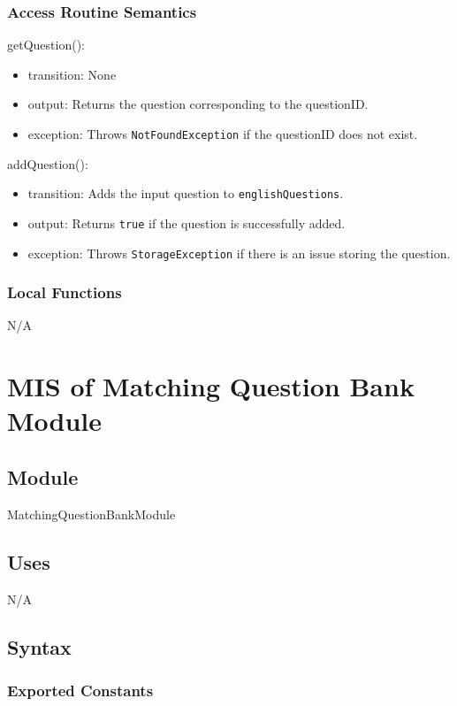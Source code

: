 \documentclass[12pt, titlepage]{article}
\begin{document}
\subsubsection{Access Routine Semantics}

\noindent getQuestion():
\begin{itemize}
\item transition: None
\item output: Returns the question corresponding to the questionID.
\item exception: Throws \texttt{NotFoundException} if the questionID does not exist.
\end{itemize}

\noindent addQuestion():
\begin{itemize}
\item transition: Adds the input question to \texttt{englishQuestions}.
\item output: Returns \texttt{true} if the question is successfully added.
\item exception: Throws \texttt{StorageException} if there is an issue storing the question.
\end{itemize}

\subsubsection{Local Functions}

N/A

\section{MIS of Matching Question Bank Module} \label{MatchingQuestionBankModule}

\subsection{Module}

MatchingQuestionBankModule

\subsection{Uses}

N/A

\subsection{Syntax}

\subsubsection{Exported Constants}
\end{document}
